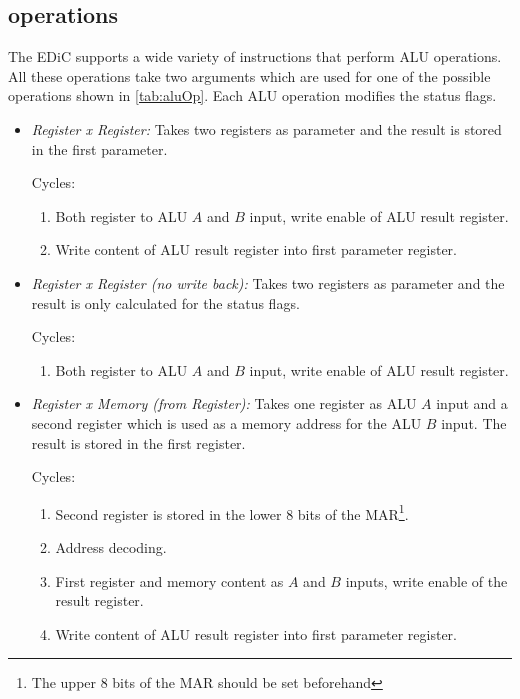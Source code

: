 \subsection{ operations}
The \gls{EDiC} supports a wide variety of instructions that perform \gls{ALU} operations.
All these operations take two arguments which are used for one of the possible operations shown in \cref{tab:aluOp}.
Each \gls{ALU} operation modifies the status flags.
\begin{itemize}
  \item \emph{Register x Register:} Takes two registers as parameter and the result is stored in the first parameter.

  Cycles:
  \begin{enumerate}
    \item Both register to \gls{ALU} $A$ and $B$ input, write enable of \gls{ALU} result register.
    \item Write content of \gls{ALU} result register into first parameter register.
  \end{enumerate}

  \item \emph{Register x Register (no write back):} Takes two registers as parameter and the result is only calculated for the status flags.

  Cycles:
  \begin{enumerate}
    \item Both register to \gls{ALU} $A$ and $B$ input, write enable of \gls{ALU} result register.
  \end{enumerate}

  \item \emph{Register x Memory (from Register):} Takes one register as \gls{ALU} $A$ input and a second register which is used as a memory address for the \gls{ALU} $B$ input.
  The result is stored in the first register.

  Cycles:
  \begin{enumerate}
    \item Second register is stored in the lower 8 bits of the \gls{MAR}\footnote{The upper 8 bits of the \gls{MAR} should be set beforehand}.
    \item Address decoding.
    \item First register and memory content as $A$ and $B$ inputs, write enable of the result register.
    \item Write content of \gls{ALU} result register into first parameter register.
  \end{enumerate}


\end{itemize}
